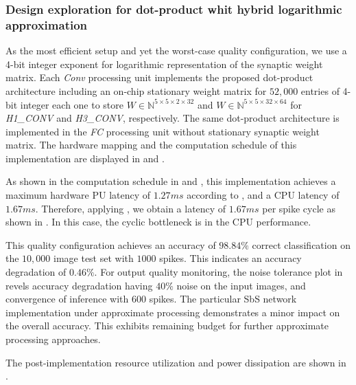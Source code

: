 \subsubsection{Design exploration for dot-product whit hybrid logarithmic approximation}
As the most efficient setup and yet the worst-case quality configuration, we use a 4-bit integer exponent for logarithmic representation of the synaptic weight matrix. Each \emph{Conv} processing unit implements the proposed dot-product architecture including an on-chip stationary weight matrix for $52,000$ entries of 4-bit integer each one to store $W\in\mathbb{N}^{5\times 5\times 2\times 32}$ and $W\in\mathbb{N}^{5\times 5\times 32\times 64}$ for \emph{H1\_CONV} and \emph{H3\_CONV}, respectively. The same dot-product architecture is implemented in the \emph{FC} processing unit without stationary synaptic weight matrix. The hardware mapping and the computation schedule of this implementation are displayed in  and .

As shown in the computation schedule in  and , this implementation achieves a maximum hardware PU latency of $1.27 ms$ according to , and a CPU latency of $1.67 ms$. Therefore, applying , we obtain a latency of $1.67 ms$ per spike cycle as shown in . In this case, the cyclic bottleneck is in the CPU performance.

This quality configuration achieves an accuracy of $98.84\%$ correct classification on the $10,000$ image test set with $1000$ spikes. This indicates an accuracy degradation of $0.46\%$. For output quality monitoring, the noise tolerance plot in  revels accuracy degradation having $40\%$ noise on the input images, and convergence of inference with $600$ spikes. The particular SbS network implementation under approximate processing demonstrates a minor impact on the overall accuracy. This exhibits remaining budget for further approximate processing approaches.

The post-implementation resource utilization and power dissipation
are shown in 
.

